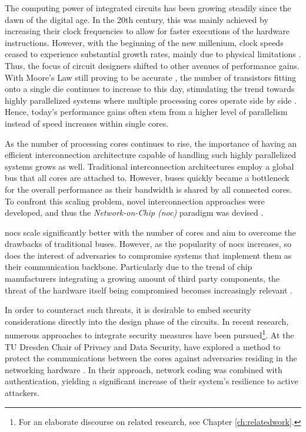 The computing power of integrated circuits has been growing steadily since the dawn of the digital age. In the 20th century, this was mainly achieved
by increasing their clock frequencies to allow for faster executions of the hardware instructions. However, with the beginning of the new millenium,
clock speeds ceased to experience substantial growth rates, mainly due to physical limitations \cite{intelfrequency}. Thus, the focus of circuit
designers shifted to other avenues of performance gains. With Moore's Law still proving to be accurate \cite{mack11mooreslaw}, the number of
transistors fitting onto a single die continues to increase to this day, stimulating the trend towards highly parallelized systems where multiple
processing cores operate side by side \cite[6]{kumar08parallel}. Hence, today's performance gains often stem from a higher level of parallelism
instead of speed increases within single cores.

As the number of processing cores continues to rise, the importance of having an efficient interconnection architecture capable of handling such
highly parallelized systems grows as well. Traditional interconnection architectures employ a global bus that all cores are attached to. However,
buses quickly became a bottleneck for the overall performance \cite[6]{tatas16designingnocs} as their bandwidth is shared by all connected cores. To confront this
scaling problem, novel interconnection approaches were developed, and thus the \textit{Network-on-Chip (\gls{noc})} paradigm was devised
\cites{kumar02networkonchip}{benini02nocparadigm}.

\Glspl{noc} scale significantly better with the number of cores and aim to overcome the drawbacks of traditional buses. However, as the popularity of
\glspl{noc} increases, so does the interest of adversaries to compromise systems
that implement them as their communication backbone. Particularly due to the trend of chip manufacturers integrating a growing amount of third party components, the
threat of the hardware itself being compromised becomes increasingly relevant \cites{ancajas14fortnocs}{sethumadhavan15trustworthyhardware}.

In order to counteract such threats, it is desirable to embed security considerations directly into the design phase of the circuits. In recent
research, numerous approaches to integrate security measures have been pursued\footnote{For an elaborate
discourse on related research, see Chapter \ref{ch:relatedwork}.}. At the TU Dresden Chair of Privacy and Data Security,
\citeauthor{moriam18activeattackers} have explored a method to protect the communications between the cores against adversaries residing in the networking
hardware \cites{moriam15manycorenc}{moriam18activeattackers}. In their approach, network coding was combined with authentication, yielding a
significant increase of their system's resilience to active attackers.

